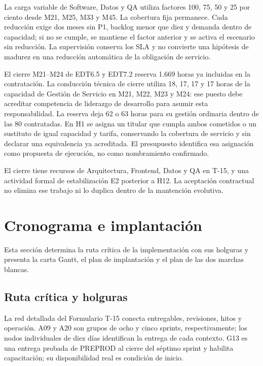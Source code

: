 La carga variable de Software, Datos y QA utiliza factores 100, 75, 50 y 25 por ciento desde
M21, M25, M33 y M45. La cobertura fija permanece. Cada reducción exige dos meses sin P1,
backlog menor que diez y demanda dentro de capacidad; si no se cumple, se mantiene el factor
anterior y se activa el escenario sin reducción. La supervisión conserva los SLA y no convierte
una hipótesis de madurez en una reducción automática de la obligación de servicio.

El cierre M21--M24 de EDT6.5 y EDT7.2 reserva 1.669 horas ya incluidas en la contratación.
La conducción técnica de cierre utiliza 18, 17, 17 y 17 horas de la capacidad de Gestión de Servicio
en M21, M22, M23 y M24: ese puesto debe acreditar competencia de liderazgo de desarrollo para
asumir esta responsabilidad. La reserva deja 62 o 63 horas para su gestión ordinaria dentro de
las 80 contratadas. En H1 se asigna un titular que cumpla ambos cometidos o un sustituto de igual
capacidad y tarifa, conservando la cobertura de servicio y sin declarar una equivalencia ya acreditada.
El presupuesto identifica esa asignación como propuesta de ejecución, no como nombramiento confirmado.

El cierre tiene recursos de Arquitectura, Frontend, Datos y QA
en T-15, y una actividad formal de estabilización E2 posterior a H12. La aceptación contractual
no elimina ese trabajo ni lo duplica dentro de la mantención evolutiva.

\section{Cronograma e implantación}\label{sec:7-cronograma}

Esta sección determina la ruta crítica de la implementación con sus holguras y presenta la carta
Gantt, el plan de implantación y el plan de las dos marchas blancas.

\subsection{Ruta crítica y holguras}\label{sec:7-ruta}

La red detallada del Formulario T-15 conecta entregables, revisiones, hitos y operación.
A09 y A20 son grupos de ocho y cinco sprints, respectivamente; los nodos individuales de diez
días identifican la entrega de cada contexto. G13 es una entrega probada de PREPROD al cierre
del séptimo sprint y habilita capacitación; su disponibilidad real es condición de inicio.

